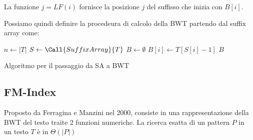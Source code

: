 La funzione $j = LF(i)$ fornisce la posizione $j$ del suffisso che inizia con $B[i]$.

Possiamo quindi definire la procedeura di calcolo della BWT partendo dal suffix
array come:
\begin{algorithm}
    \begin{algorithmic}
        \State $n \gets |T|$
        \State $S \gets \Call{SuffixArray}{T}$
        \State $B \gets \emptyset$
        \State $B[i] \gets T[S[i] - 1]$
        \EndFor
        \State \Return $B$
        \EndFunction
    \end{algorithmic}
    \caption{Algoritmo per il passaggio da SA a BWT}
\end{algorithm}
\subsection{FM-Index}
Proposto da Ferragina e Manzini nel 2000, consiste in una rappresentazione della
BWT del testo traite 2 funzioni numeriche. La ricerca esatta di un pattern $P$ in
un testo $T$ è in $\Theta(|P|)$